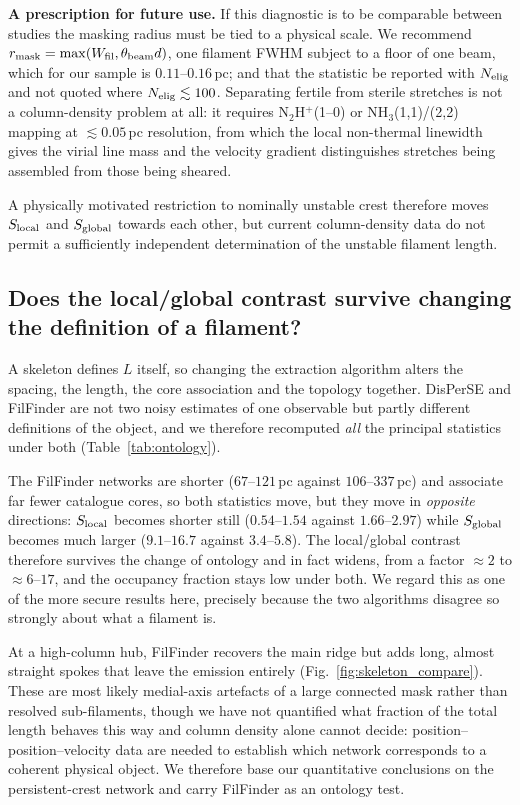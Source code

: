 \documentclass[usenatbib,twoside,twocolumn]{mnras}
\begin{document}
\smallskip\noindent\textbf{A prescription for future use.} If this diagnostic is to be comparable between studies the masking radius must be tied to a physical scale. We recommend $r_{\rm mask}=\max(W_{\rm fil},\theta_{\rm beam}d)$, one filament FWHM subject to a floor of one beam, which for our sample is $0.11$--$0.16$\,pc; and that the statistic be reported with $N_{\rm elig}$ and not quoted where $N_{\rm elig}\lesssim100$. Separating fertile from sterile stretches is not a column-density problem at all: it requires N$_2$H$^+$(1--0) or NH$_3$(1,1)/(2,2) mapping at $\lesssim0.05$\,pc resolution, from which the local non-thermal linewidth gives the virial line mass and the velocity gradient distinguishes stretches being assembled from those being sheared.

A physically motivated restriction to nominally unstable crest therefore moves $S_{\rm local}$ and $S_{\rm global}$ towards each other, but current column-density data do not permit a sufficiently independent determination of the unstable filament length.



\subsection{Does the local/global contrast survive changing the definition of a filament?}
\label{sec:ontology}

A skeleton defines $L$ itself, so changing the extraction algorithm alters the spacing, the length, the core association and the topology together. DisPerSE and FilFinder are not two noisy estimates of one observable but partly different definitions of the object, and we therefore recomputed \emph{all} the principal statistics under both (Table~\ref{tab:ontology}).

The FilFinder networks are shorter ($67$--$121$\,pc against $106$--$337$\,pc) and associate far fewer catalogue cores, so both statistics move, but they move in \emph{opposite} directions: $S_{\rm local}$ becomes shorter still ($0.54$--$1.54$ against $1.66$--$2.97$) while $S_{\rm global}$ becomes much larger ($9.1$--$16.7$ against $3.4$--$5.8$). The local/global contrast therefore survives the change of ontology and in fact widens, from a factor $\approx2$ to $\approx6$--$17$, and the occupancy fraction stays low under both. We regard this as one of the more secure results here, precisely because the two algorithms disagree so strongly about what a filament is.

At a high-column hub, FilFinder recovers the main ridge but adds long, almost straight spokes that leave the emission entirely (Fig.~\ref{fig:skeleton_compare}). These are most likely medial-axis artefacts of a large connected mask rather than resolved sub-filaments, though we have not quantified what fraction of the total length behaves this way and column density alone cannot decide: position--position--velocity data are needed to establish which network corresponds to a coherent physical object. We therefore base our quantitative conclusions on the persistent-crest network and carry FilFinder as an ontology test.
\end{document}
